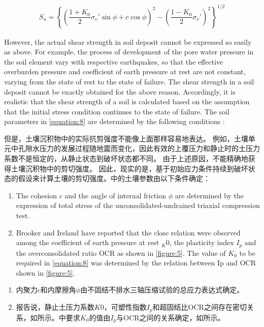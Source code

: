 \begin{align}
    S_u=\left\{\left(\dfrac{1+K_0}{2}\sigma_v'\sin\phi+c\cos\phi\right)^2-\left(\dfrac{1-K_0}{2}\sigma_v'\right)^2\right\}^{1/2}
    \label{equation:8}
\end{align}

\begin{paracol}{2}
    
    However, the actual shear strength in soil deposit cannot be expressed so easily as above. For example, the process of development of the pore water pressure in the soil element vary with respective earthquakes, so that the effective overburden pressure and coefficient of earth pressure at rest are not constant, varying from the state of rest to the state of failure. The shear strength in a soil deposit cannot be exactly obtained for the above reason. Accordingly, it is realistic that the shear strength of a soil is calculated based on the assumption that the initial stress condition continues to the state of failure. The soil parameters in \autoref{equation:8} are determined by the following conditions : 

    \switchcolumn

    但是，土壤沉积物中的实际抗剪强度不能像上面那样容易地表达。 例如，土壤单元中孔隙水压力的发展过程随地震而变化，因此有效的上覆压力和静止时的土压力系数不是恒定的，从静止状态到破坏状态都不同。 由于上述原因，不能精确地获得土壤沉积物中的剪切强度。 因此，现实的是，基于初始应力条件持续到破坏状态的假设来计算土壤的剪切强度。中的土壤参数由以下条件确定：

    \switchcolumn*

    \begin{enumerate}
        \item The cohesion $c$ and the angle of internal friction $\phi$ are determined by the expression of total stress of the unconsolidated-undrained triaxial compression test.
        \item Brooker and Ireland have reported that the close relation were observed among the coefficient of earth pressure at rest $_K0$, the plasticity index $I_p$ and the overconsolidated ratio OCR as shown in \autoref{figure:5}. The value of $K_0$ to be required in \autoref{equation:8} was determined by the relation between Ip and OCR shown in \autoref{figure:5}.
    \end{enumerate}

    \switchcolumn

    \begin{enumerate}
        \item 内聚力$c$和内摩擦角$\phi$由不固结不排水三轴压缩试验的总应力表达式确定。
        \item \citet{Brooker19651}报告说，静止土压力系数$K0$，可塑性指数$I_p$和超固结比OCR之间存在密切关系，如所示。中要求$K_0$的值由$I_p$与OCR之间的关系确定，如所示。
    \end{enumerate}

\end{paracol}

